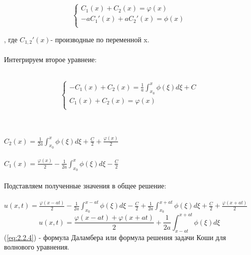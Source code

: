 \documentclass[../main.tex]{subfiles}
\begin{document}
\begin{left}
$$
\left\{
\begin{array}{}
 C_1(x)+C_2(x)=\varphi(x)\\
-aC_1'(x)+aC_2'(x)=\phi(x)\\
\end{array}
\right.
$$
\end{left}
, где $C_{1,2}'(x)$- производные по переменной x.\\
\\Интегрируем второе уравнеие:\\\\
\begin{left}
$$
\left\{
\begin{array}{lcl}
-C_1(x)+C_2(x)=\frac{1}{a}\int_{x_0}^x\phi(\xi)d\xi+C\\
C_1(x)+C_2(x)=\varphi(x)\\
\end{array}
\right.
$$
\end{left}
\\\\
$C_2(x)=\frac{1}{2a}\int_{x_0}^x\phi(\xi)d\xi+\frac{C}{2}+\frac{\varphi(x)}{2}$\\\\
$C_1(x)=\frac{\varphi(x)}{2}-\frac{1}{2a}\int_{x_0}^x\phi(\xi)d\xi-\frac{C}{2}$\\\\
Подставляем полученные значения в общее решение:\\\\
$u(x,t)=\frac{\varphi(x-at)}{2}-\frac{1}{2a}\int_{x_0}^{x-at}\phi(\xi)d\xi-\frac{C}{2}+\frac{1}{2a}\int_{x_0}^{x+at}\phi(\xi)d\xi+\frac{C}{2}+\frac{\varphi(x+at)}{2}$
\begin{equation}\label{eq:2.2.4}
u(x,t)=\frac{\varphi(x-at)+\varphi(x+at)}{2}+\frac{1}{2a}\int_{x-at}^{x+at}\phi(\xi)d\xi
\end{equation}
(\ref{eq:2.2.4}) - формула Даламбера или формула решения задачи Коши для волнового уравнения.
\end{document}
